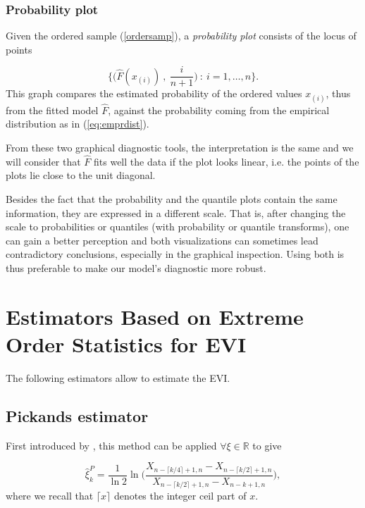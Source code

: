 \subsubsection*{Probability plot} Given the ordered sample (\ref{ordersamp}), a \emph{probability plot} consists of the locus of points 

\begin{equation}
\Bigg\{\bigg(\hat{F}(x_{(i)})\ ,\ \frac{i}{n+1}\bigg) \ : \ i=1,\dots,n\Bigg\}.
\end{equation}
This graph compares the estimated probability of the ordered values $x_{(i)}$, thus from the fitted model $\hat{F}$, against the probability coming from the empirical distribution as in (\ref{eq:emprdist}). 

From these two graphical diagnostic tools, the interpretation is the same and we will consider that $\hat{F}$ fits well the data if the plot looks linear, i.e. the points of the plots lie close to the unit diagonal.

Besides the fact that the probability and the quantile plots contain the same information, they are expressed in a different scale. That is, after changing the scale to probabilities or quantiles (with probability or quantile transforms), one can gain a better perception and both visualizations can sometimes lead contradictory conclusions, especially in the graphical inspection. Using both is thus preferable to make our model's diagnostic more robust.

\section{Estimators Based on Extreme Order Statistics for EVI}\label{sec:infevi}
The following estimators allow to estimate the EVI. 

\subsection*{Pickands estimator}


First introduced by \cite{iii_statistical_1975-1}, this method can be applied $\forall\xi\in\mathbb{R}$ to give

\begin{equation}
\hat{\xi}^P_{k}= \frac{1}{\ln 2}\ln \Bigg(\frac{X_{n-\lceil k/4\rceil +1,n}-X_{n-\lceil k/2\rceil+1,n}}{X_{n-\lceil k/2\rceil +1,n}-X_{n-k+1,n}}\Bigg),
\end{equation}
where we recall that $\lceil x\rceil$ denotes the integer ceil part of $x$.

